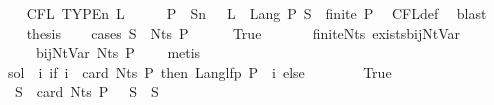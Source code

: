 \begin{isabellebody}
\ \ \isamarkupfalse%
\ {\isachardoublequoteopen}CFL\ {\isacharparenleft}{\kern0pt}TYPE{\isacharparenleft}{\kern0pt}{\isacharprime}{\kern0pt}n{\isacharparenright}{\kern0pt}{\isacharparenright}{\kern0pt}\ L{\isachardoublequoteclose}\isanewline
\ \ \isamarkupfalse%
\ \isamarkupfalse%
\ P\ \ S{\isacharcolon}{\kern0pt}{\isacharcolon}{\kern0pt}{\isacharprime}{\kern0pt}n\ \ {\isacharasterisk}{\kern0pt}{\isacharcolon}{\kern0pt}\ {\isachardoublequoteopen}L\ {\isacharequal}{\kern0pt}\ Lang\ P\ S\ {\isasymand}\ finite\ P{\isachardoublequoteclose}\ \isamarkupfalse%
\ CFL{\isacharunderscore}{\kern0pt}def\ \isamarkupfalse%
\ blast\isanewline
\ \ \isamarkupfalse%
\ {\isacharquery}{\kern0pt}thesis\isanewline
\ \ \isamarkupfalse%
\ {\isacharparenleft}{\kern0pt}cases\ {\isachardoublequoteopen}S\ {\isasymin}\ Nts\ P{\isachardoublequoteclose}{\isacharparenright}{\kern0pt}\isanewline
\ \ \ \ \isamarkupfalse%
\ True\isanewline
\ \ \ \ \isamarkupfalse%
\ {\isacharasterisk}{\kern0pt}\ finite{\isacharunderscore}{\kern0pt}Nts\ exists{\isacharunderscore}{\kern0pt}bij{\isacharunderscore}{\kern0pt}Nt{\isacharunderscore}{\kern0pt}Var\ \isamarkupfalse%
\ {\isasymgamma}\ {\isasymgamma}{\isacharprime}{\kern0pt}\ \ {\isacharasterisk}{\kern0pt}{\isacharasterisk}{\kern0pt}{\isacharcolon}{\kern0pt}\ {\isachardoublequoteopen}bij{\isacharunderscore}{\kern0pt}Nt{\isacharunderscore}{\kern0pt}Var\ {\isacharparenleft}{\kern0pt}Nts\ P{\isacharparenright}{\kern0pt}\ {\isasymgamma}\ {\isasymgamma}{\isacharprime}{\kern0pt}{\isachardoublequoteclose}\ \isamarkupfalse%
\ metis\isanewline
\ \ \ \ \isamarkupfalse%
\ {\isacharquery}{\kern0pt}sol\ {\isacharequal}{\kern0pt}\ {\isachardoublequoteopen}{\isasymlambda}i{\isachardot}{\kern0pt}\ if\ i\ {\isacharless}{\kern0pt}\ card\ {\isacharparenleft}{\kern0pt}Nts\ P{\isacharparenright}{\kern0pt}\ then\ Lang{\isacharunderscore}{\kern0pt}lfp\ P\ {\isacharparenleft}{\kern0pt}{\isasymgamma}\ i{\isacharparenright}{\kern0pt}\ else\ {\isacharbraceleft}{\kern0pt}{\isacharbraceright}{\kern0pt}{\isachardoublequoteclose}\isanewline
\ \ \ \ \isamarkupfalse%
\ {\isacharasterisk}{\kern0pt}{\isacharasterisk}{\kern0pt}\ True\ \isamarkupfalse%
\ {\isachardoublequoteopen}{\isasymgamma}{\isacharprime}{\kern0pt}\ S\ {\isacharless}{\kern0pt}\ card\ {\isacharparenleft}{\kern0pt}Nts\ P{\isacharparenright}{\kern0pt}{\isachardoublequoteclose}\ {\isachardoublequoteopen}{\isasymgamma}\ {\isacharparenleft}{\kern0pt}{\isasymgamma}{\isacharprime}{\kern0pt}\ S{\isacharparenright}{\kern0pt}\ {\isacharequal}{\kern0pt}\ S{\isachardoublequoteclose}\isanewline

\end{isabellebody}

